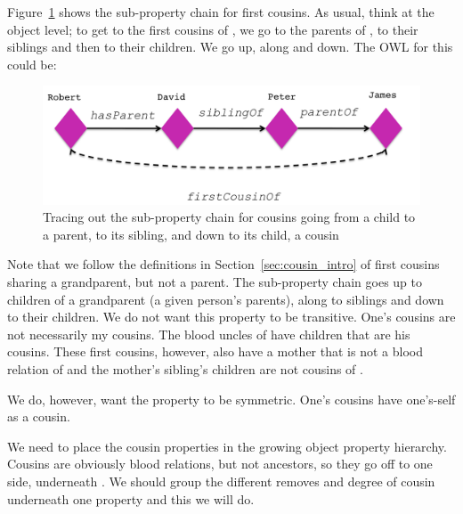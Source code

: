 Figure~\ref{fig:first_cousins} shows the sub-property chain for first cousins. As usual, think at the object level; to get to the first cousins of \rds, we go to the parents of \rds, to their siblings and then to their children. We go up, along and down. The OWL for this could be:


\begin{figure}
\begin{center}
\includegraphics[width=\figwidth]{figures/cousin}
\caption{Tracing out the sub-property chain for cousins going from a child to a parent, to its sibling, and down to its child, a cousin}
\label{fig:first_cousins}
\end{center}
\end{figure}

Note that we follow the definitions in Section~\ref{sec:cousin_intro} of first cousins sharing a grandparent, but not a parent. The sub-property chain goes up to children of a grandparent (a given person's parents), along to siblings and down to their children. We do not want this property to be transitive. One's cousins are not necessarily my cousins. The blood uncles of \rds have children that are his cousins. These first cousins, however, also have a mother that is not a blood relation of \rds and the mother's sibling's children are not cousins of \rds.  

We do, however, want the property to be symmetric. One's cousins have one's-self as a cousin.

We need to place the cousin properties in the growing object property hierarchy. Cousins are obviously blood relations, but not ancestors, so they go off to one side, underneath . We should group the different removes and degree of cousin underneath one  property and this we will do.

